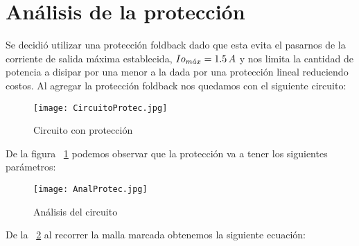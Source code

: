 \documentclass[e2_tp1_main.tex]{subfiles}
\begin{document}
\section{Análisis de la protección}
Se decidió utilizar una protección foldback dado que esta evita el pasarnos de la corriente de salida máxima establecida, $Io_{m\acute{a}x}=1.5\thinspace{A}$ y nos limita la cantidad de potencia a disipar por una menor a la dada por una protección lineal reduciendo costos.
Al agregar la protección foldback nos quedamos con el siguiente circuito:
\begin{figure}[H]
  \centering
   \texttt{[image: CircuitoProtec.jpg]}
   \caption{Circuito con protección}
   \label{fig:CircuitoProtec}
\end{figure}
De la figura ~\ref{fig:CircuitoProtec} podemos observar que la protección va a tener los siguientes parámetros:
\begin{figure}[H]
  \centering
   \texttt{[image: AnalProtec.jpg]}
   \caption{Análisis del circuito}
   \label{fig:AnalProtec}
\end{figure}
De la ~\ref{fig:AnalProtec} al recorrer la malla marcada obtenemos la siguiente ecuación:
\end{document}
